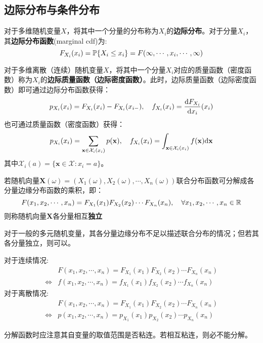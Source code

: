 \subsection{边际分布与条件分布}

\begin{definition}[边际分布]
    对于多维随机变量$X$，将其中一个分量的分布称为$X_i$的\textbf{边际分布}。对于分量$X_i$，其\textbf{边际分布函数}(marginal cdf)为:
    \[ F_{X_i}(x_i) = \P\{ X_i \le x_i \} = F(\infty,\cdots , x_i ,\cdots ,\infty)\]
\end{definition}

\begin{definition}[边际质量函数与边际密度函数]
    对于多维离散（连续）随机变量$X$，将其中一个分量$X_i$对应的质量函数（密度函数）称为$X_i$的\textbf{边际质量函数（边际密度函数）}。此时，边际质量函数（边际密度函数）即可通过边际分布函数获得：
    \[ p_{X_i}(x_i)=F_{X_i}(x_i)-F_{X_i}(x_{i-}), \quad f_{X_i}(x_i)=\frac{\d F_{X_i}}{\d x_i}(x_i) \]
    也可通过质量函数（密度函数）获得：
    \[ p_{X_i}(x_i)=\sum_{\mathbf{x}\in \mathcal{X}_i(x_i)}p(\mathbf{x}), \quad f_{X_i}(x_i)=\int_{\mathbf{x}\in \mathcal{X}_i(x_i)}f(\mathbf{x})\d \mathbf{x} \]
    其中$\mathcal{X}_i(a)=\{ \mathbf{x} \in \mathcal{X} : x_i=a \}$。
\end{definition}

\begin{definition}[独立随机变量]
    若随机向量$\mathbf{X}(\omega) = (X_1(\omega), X_2(\omega),\cdots , X_n(\omega))$联合分布函数可分解成各分量边缘分布函数的乘积，即：
    \[ F(x_1,x_2,\cdots ,x_n) = F_{X_1}(x_1)F_{X_2}(x_2)\cdots F_{X_n}(x_n) , \quad \forall x_1,x_2,\cdots ,x_n \in \R \]
    则称随机向量$\mathbf{X}$各分量相互\textbf{独立}
\end{definition}
\begin{remark}
    对于一般的多元随机变量，其各分量边缘分布不足以描述联合分布的情况；但若其各分量独立，则可以。
\end{remark}

\begin{theorem}\label{thm:indep_cmf}
    对于连续情况:
    \begin{align*}
                        & F(x_1,x_2,\cdots ,x_n) = F_{X_1}(x_1)F_{X_2}(x_2)\cdots F_{X_n}(x_n) \\
        \Leftrightarrow & f(x_1,x_2,\cdots ,x_n) = f_{X_1}(x_1)f_{X_2}(x_2)\cdots f_{X_n}(x_n)
    \end{align*}
    对于离散情况:
    \begin{align*}
                        & F(x_1,x_2,\cdots ,x_n) = F_{X_1}(x_1)F_{X_2}(x_2)\cdots F_{X_n}(x_n) \\
        \Leftrightarrow & p(x_1,x_2,\cdots ,x_n) = p_{X_1}(x_1)p_{X_2}(x_2)\cdots p_{X_n}(x_n)
    \end{align*}
\end{theorem}
\begin{remark}
    分解函数时应注意其自变量的取值范围是否粘连。若相互粘连，则必不能分解。
\end{remark}

